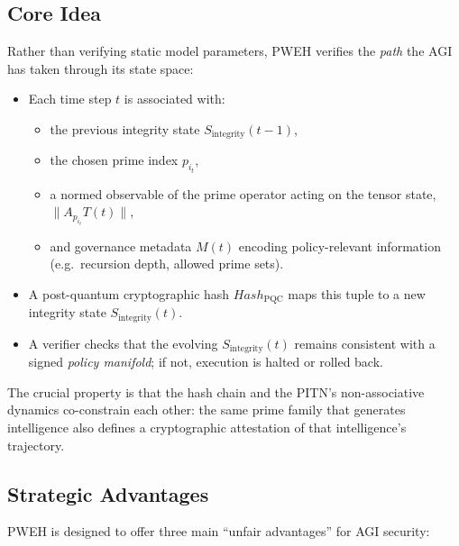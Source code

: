 \documentclass[11pt]{article}
\begin{document}
\subsection{Core Idea}

Rather than verifying static model parameters, PWEH verifies the \emph{path} the AGI has taken through its state space:

\begin{itemize}[leftmargin=1.5em]
  \item Each time step \(t\) is associated with:
  \begin{itemize}
    \item the previous integrity state \(S_{\text{integrity}}(t-1)\),
    \item the chosen prime index \(p_{i_t}\),
    \item a normed observable of the prime operator acting on the tensor state, \(\|A_{p_{i_t}}T(t)\|\),
    \item and governance metadata \(M(t)\) encoding policy-relevant information (e.g.\ recursion depth, allowed prime sets).
  \end{itemize}
  \item A post-quantum cryptographic hash \(Hash_{\text{PQC}}\) maps this tuple to a new integrity state \(S_{\text{integrity}}(t)\).
  \item A verifier checks that the evolving \(S_{\text{integrity}}(t)\) remains consistent with a signed \emph{policy manifold}; if not, execution is halted or rolled back.
\end{itemize}

The crucial property is that the hash chain and the PITN's non-associative dynamics co-constrain each other: the same prime family that generates intelligence also defines a cryptographic attestation of that intelligence's trajectory.

\subsection{Strategic Advantages}

PWEH is designed to offer three main ``unfair advantages'' for AGI security:
\end{document}
